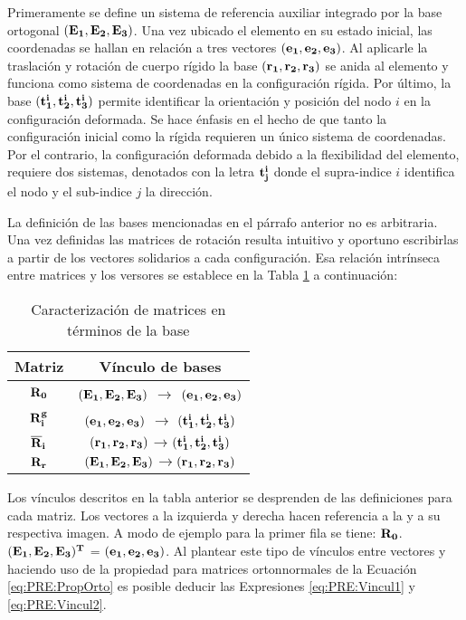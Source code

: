 Primeramente se define un sistema de referencia auxiliar integrado por la base ortogonal $(\bf{E_1},\bf{E_2},\bf{E_3})$. Una vez ubicado el elemento en su estado inicial, las coordenadas se hallan en relación a tres vectores $(\bf{e_1},\bf{e_2},\bf{e_3})$. Al aplicarle la traslación y rotación de cuerpo rígido la base $(\bf{r_1},\bf{r_2},\bf{r_3})$ se anida al elemento y funciona como sistema de coordenadas en la configuración rígida. Por último, la base $(\bf{t_1^i},\bf{t_2^i},\bf{t_3^i})$ permite identificar la orientación y posición del nodo $i$ en la configuración deformada. Se hace énfasis en el hecho de que tanto la configuración inicial como la rígida requieren un único sistema de coordenadas. Por el contrario, la configuración deformada debido a la flexibilidad del elemento, requiere dos sistemas, denotados con la letra $\bf{t}_j^i$ donde el supra-indice $i$ identifica el nodo y el sub-indice $j$ la dirección.


La definición de las bases mencionadas en el párrafo anterior no es arbitraria. Una vez definidas las matrices de rotación resulta intuitivo y oportuno escribirlas a partir de los vectores solidarios a cada configuración. Esa relación intrínseca entre matrices y los versores se establece en la Tabla \ref{Table:PRE:RelacionVM} a continuación: 

\begin{table}[htbp]
	\begin{center}
		\begin{tabular}{|c|c|}
			\hline
			Matriz & Vínculo de bases \\
			\hline \hline
			$\bf{R}_0$ &$(\bf{E_1},\bf{E_2},\bf{E_3})$ $\rightarrow$
			$(\bf{e_1},\bf{e_2},\bf{e_3})$   \\ \hline
			$\bf{R}_i^g$ & $(\bf{e_1},\bf{e_2},\bf{e_3})$ $\rightarrow$
			$(\bf{t_1^i},\bf{t_2^i},\bf{t_3^i})$ \\ \hline
			$\bf{\overline{R}}_i$ &
			$(\bf{r_1},\bf{r_2},\bf{r_3})$$\rightarrow$$(\bf{t_1^i},\bf{t_2^i},\bf{t_3^i})$
			\\ \hline
			$\bf{R}_r$ &
			$(\bf{E_1},\bf{E_2},\bf{E_3})$$\rightarrow$$(\bf{r_1},\bf{r_2},\bf{r_3})$ \\
			\hline
		\end{tabular}
		\caption{Caracterización de matrices en términos de la base}
		\label{Table:PRE:RelacionVM}
	\end{center}
\end{table}


Los vínculos descritos en la tabla anterior se desprenden de las definiciones para cada matriz. Los vectores a la izquierda y derecha hacen referencia a la y a su respectiva imagen. A modo de ejemplo para la primer fila se tiene: $\bf{R}_0$. $(\bf{E_1},\bf{E_2},\bf{E_3})^T$ = $(\bf{e_1},\bf{e_2},\bf{e_3})$. Al plantear este tipo de vínculos entre vectores y haciendo uso de la propiedad para matrices ortonnormales de la Ecuación \ref{eq:PRE:PropOrto} es posible deducir las Expresiones \eqref{eq:PRE:Vincul1} y \eqref{eq:PRE:Vincul2}.


